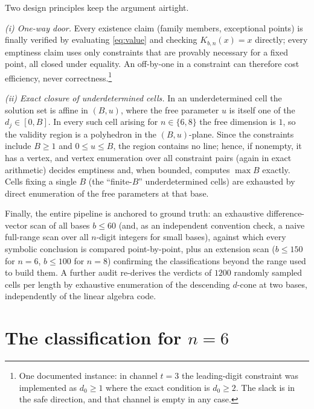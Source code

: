 \documentclass[11pt]{amsart}
\theoremstyle{definition}
\begin{document}
\smallskip
Two design principles keep the argument airtight.

\emph{(i) One-way door.} Every existence claim (family members,
exceptional points) is finally verified by evaluating
\eqref{eq:value} and checking $K_{b,n}(x)=x$ directly; every emptiness
claim uses only constraints that are provably necessary for a fixed
point, all closed under equality. An off-by-one in a constraint can
therefore cost efficiency, never correctness.\footnote{One documented
instance: in channel $t=3$ the leading-digit constraint was implemented
as $d_0\ge1$ where the exact condition is $d_0\ge2$. The slack is in
the safe direction, and that channel is empty in any case.}

\emph{(ii) Exact closure of underdetermined cells.} In an
underdetermined cell the solution set is affine in $(B,u)$, where the
free parameter $u$ is itself one of the $d_j\in[0,B]$. In every such
cell arising for $n\in\{6,8\}$ the free dimension is $1$, so the
validity region is a polyhedron in the $(B,u)$-plane. Since the
constraints include $B\ge 1$ and $0\le u\le B$, the region contains no
line; hence, if nonempty, it has a vertex, and vertex enumeration over
all constraint pairs (again in exact arithmetic) decides emptiness and,
when bounded, computes $\max B$ exactly. Cells fixing a single $B$
(the ``finite-$B$'' underdetermined cells) are exhausted by direct
enumeration of the free parameters at that base.

Finally, the entire pipeline is anchored to ground truth: an exhaustive
difference-vector scan of all bases $b\le 60$ (and, as an independent
convention check, a naive full-range scan over all $n$-digit integers
for small bases), against which every symbolic conclusion is compared
point-by-point, plus an extension scan ($b\le 150$ for $n=6$, $b\le 100$
for $n=8$) confirming the classifications beyond the range used to
build them. A further audit re-derives the verdicts of $1200$ randomly
sampled cells per length by exhaustive enumeration of the descending
$d$-cone at two bases, independently of the linear algebra code.

\section{The classification for \texorpdfstring{$n=6$}{n=6}}
\end{document}
